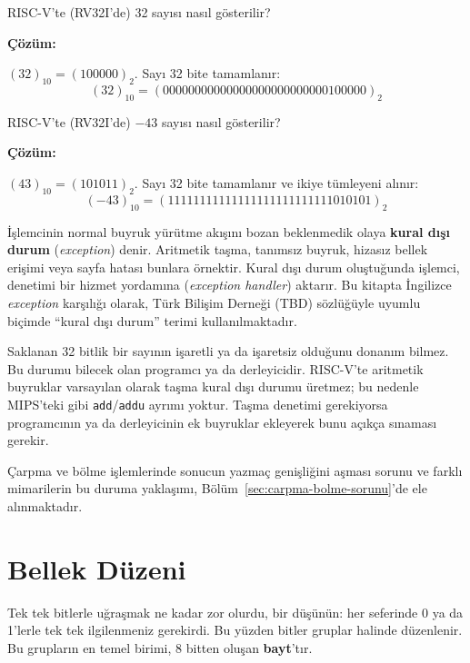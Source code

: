 \begin{ornek}[3.6]
RISC-V'te (RV32I'de) 32 sayısı nasıl gösterilir?

\textbf{Çözüm:}

$(32)_{10} = (100000)_2$. Sayı 32 bite tamamlanır:
\[
(32)_{10} = (00000000000000000000000000100000)_2
\]
\end{ornek}

\begin{ornek}[3.7]
RISC-V'te (RV32I'de) $-43$ sayısı nasıl gösterilir?

\textbf{Çözüm:}

$(43)_{10} = (101011)_2$. Sayı 32 bite tamamlanır ve ikiye tümleyeni alınır:
\[
(-43)_{10} = (11111111111111111111111111010101)_2
\]
\end{ornek}

\begin{tanim}
İşlemcinin normal buyruk yürütme akışını bozan beklenmedik olaya \textbf{kural dışı durum} (\emph{exception}) denir. Aritmetik taşma, tanımsız buyruk, hizasız bellek erişimi veya sayfa hatası bunlara örnektir. Kural dışı durum oluştuğunda işlemci, denetimi bir hizmet yordamına (\emph{exception handler}) aktarır. Bu kitapta İngilizce \emph{exception} karşılığı olarak, Türk Bilişim Derneği (TBD) sözlüğüyle uyumlu biçimde ``kural dışı durum'' terimi kullanılmaktadır.
\end{tanim}

Saklanan 32 bitlik bir sayının işaretli ya da işaretsiz olduğunu donanım bilmez. Bu durumu bilecek olan programcı ya da derleyicidir. RISC-V'te aritmetik buyruklar varsayılan olarak taşma kural dışı durumu üretmez; bu nedenle MIPS'teki gibi \texttt{add}/\texttt{addu} ayrımı yoktur. Taşma denetimi gerekiyorsa programcının ya da derleyicinin ek buyruklar ekleyerek bunu açıkça sınaması gerekir.

Çarpma ve bölme işlemlerinde sonucun yazmaç genişliğini aşması sorunu ve farklı mimarilerin bu duruma yaklaşımı, Bölüm~\ref{sec:carpma-bolme-sorunu}'de ele alınmaktadır.


\section{Bellek Düzeni}
\label{sec:bellek-duzeni}

Tek tek bitlerle uğraşmak ne kadar zor olurdu, bir düşünün: her seferinde 0 ya da 1'lerle tek tek ilgilenmeniz gerekirdi. Bu yüzden bitler gruplar halinde düzenlenir. Bu grupların en temel birimi, 8 bitten oluşan \textbf{bayt}'tır.

